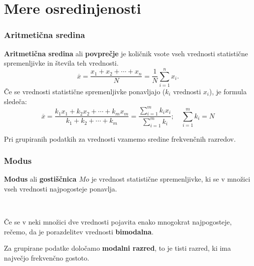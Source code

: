             

                    \newpage

    \section{Mere osredinjenosti}

        

            \subsubsection{Aritmetična sredina}
                \textbf{Aritmetična sredina} ali \textbf{povprečje} je količnik vsote vseh vrednosti 
                statistične spremenljivke in števila teh vrednosti. \\

                $$\overline{x}=\dfrac{x_1+x_2+\cdots+x_n}{N}=\dfrac{1}{N}\sum_{i=1}^n x_i.$$
                Če se vrednosti statistične spremenljivke ponavljajo ($k_i$ vrednosti $x_i$), je formula sledeča:
                $$\overline{x}=\dfrac{k_1x_1+k_2x_2+\cdots+k_mx_m}{k_1+k_2+\cdots+k_m}=\dfrac{\sum_{i=1}^mk_ix_i}{\sum_{i=1}^mk_i}; \quad \sum_{i=1}^mk_i=N$$
  
               

            
                Pri grupiranih podatkih za vrednosti vzamemo sredine frekvenčnih razredov.
            

        

        
            \subsubsection{Modus}
                \textbf{Modus} ali \textbf{gostiščnica $Mo$} je vrednost statistične spremenljivke, ki se v množici vseh vrednosti najpogosteje ponavlja.                 
            
                    ~
            
                Če se v neki množici dve vrednosti pojavita enako mnogokrat najpogosteje, rečemo, da je porazdelitev vrednosti \textbf{bimodalna}.
            

            
                Za grupirane podatke določamo \textbf{modalni razred}, to je tisti razred, ki ima največjo frekvenčno gostoto.
            
        

